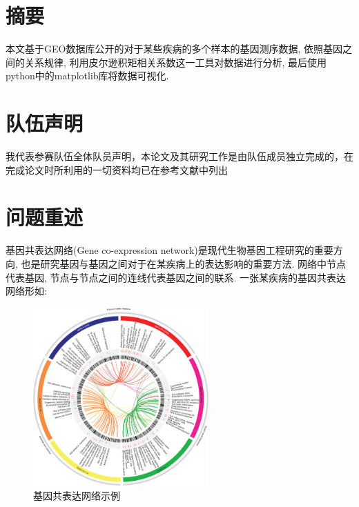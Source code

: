 \documentclass[zihao=-4]{ctexart}
\begin{document}
\normalsize
\renewcommand{\headrulewidth}{0pt}%
\newpage
\section*{摘要}

本文基于GEO数据库公开的对于某些疾病的多个样本的基因测序数据, 依照基因之间的关系规律, 利用皮尔逊积矩相关系数这一工具对数据进行分析, 最后使用python中的matplotlib库将数据可视化.

\newpage

\section*{队伍声明}

我代表参赛队伍全体队员声明，本论文及其研究工作是由队伍成员独立完成的，在完成论文时所利用的一切资料均已在参考文献中列出 
\newpage
\renewcommand{\headrulewidth}{0.4pt} %
\setcounter{page}{1} 

\tableofcontents

\section{问题重述}
基因共表达网络(Gene co-expression network)是现代生物基因工程研究的重要方向, 也是研究基因与基因之间对于在某疾病上的表达影响的重要方法. 网络中节点代表基因, 节点与节点之间的连线代表基因之间的联系. 一张某疾病的基因共表达网络形如:
\begin{figure}[H]
    \centering
    \includegraphics[width=0.6\textwidth]{pic/example.jpg}
    \caption{基因共表达网络示例\cite{example}}
\end{figure}
\end{document}
